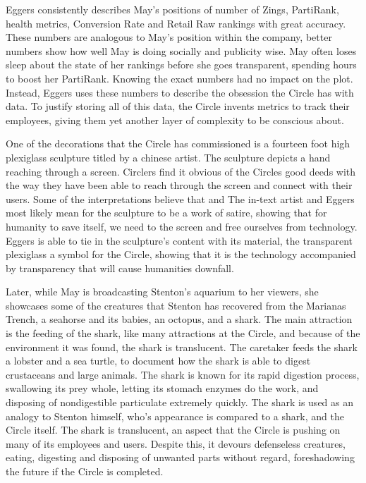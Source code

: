 Eggers consistently describes May's positions of number of Zings, PartiRank, health metrics, Conversion Rate and Retail Raw rankings with great accuracy.
These numbers are analogous to May's position within the company, better numbers show how well May is doing socially and publicity wise.
May often loses sleep about the state of her rankings before she goes transparent, spending hours to boost her PartiRank.
Knowing the exact numbers had no impact on the plot.
Instead, Eggers uses these numbers to describe the obsession the Circle has with data.
To justify storing all of this data, the Circle invents metrics to track their employees, giving them yet another layer of complexity to be conscious about.

One of the decorations that the Circle has commissioned is a fourteen foot high plexiglass sculpture titled  \autocite[190]{eggers1} by a chinese artist.
The sculpture depicts a hand reaching through a screen.
Circlers find it obvious of the Circles good deeds with the way they have been able to reach through the screen and connect with their users.
Some of the interpretations believe that  \autocite[190]{eggers1} and  \autocite[190]{eggers1}
The in-text artist and Eggers most likely mean for the sculpture to be a work of satire, showing that for humanity to save itself, we need to  the screen and free ourselves from technology.
Eggers is able to tie in the sculpture's content with its material, the transparent plexiglass a symbol for the Circle, showing that it is the technology accompanied by transparency that will cause humanities downfall.

Later, while May is broadcasting Stenton's aquarium to her viewers, she showcases some of the creatures that Stenton has recovered from the Marianas Trench, a seahorse and its babies, an octopus, and a shark.
The main attraction is the feeding of the shark, like many attractions at the Circle, and because of the environment it was found, the shark is translucent.
The caretaker feeds the shark a lobster and a sea turtle, to document how the shark is able to digest crustaceans and large animals.
The shark is known for its rapid digestion process, swallowing its prey whole, letting its stomach enzymes do the work, and disposing of nondigestible particulate extremely quickly.
The shark is used as an analogy to Stenton himself, who's appearance is compared to a shark, and the Circle itself.
The shark is translucent, an aspect that the Circle is pushing on many of its employees and users.
Despite this, it devours defenseless creatures, eating, digesting and disposing of unwanted parts without regard, foreshadowing the future if the Circle is completed.

